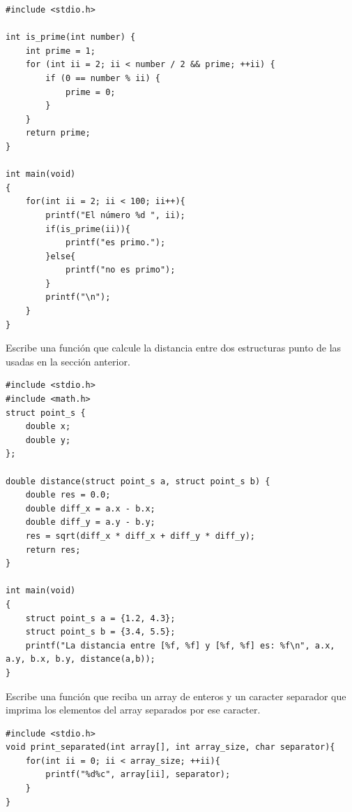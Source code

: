 \documentclass[a4paper]{article}
\begin{document}
\begin{exercises}
\noindent
\begin{minipage}[H]{\linewidth}
\mbox{}
\begin{lstlisting}[style=C,
caption={Solución al ejercicio 5},
label={lst:solution5}]
#include <stdio.h>

int is_prime(int number) {
    int prime = 1;
    for (int ii = 2; ii < number / 2 && prime; ++ii) {
        if (0 == number % ii) {
            prime = 0;
        }
    }
    return prime;
}

int main(void)
{
    for(int ii = 2; ii < 100; ii++){
        printf("El número %d ", ii);
        if(is_prime(ii)){
            printf("es primo.");
        }else{
            printf("no es primo");
        }
        printf("\n");
    }
}
\end{lstlisting}
\end{minipage}

\item Escribe una función que calcule la distancia entre dos estructuras punto
de las usadas en la sección anterior.


\noindent
\begin{minipage}[H]{\linewidth}
\mbox{}
\begin{lstlisting}[style=C,
caption={Solución al ejercicio 6},
label={lst:solution6}]
#include <stdio.h>
#include <math.h>
struct point_s {
    double x;
    double y;
};

double distance(struct point_s a, struct point_s b) {
    double res = 0.0;
    double diff_x = a.x - b.x;
    double diff_y = a.y - b.y;
    res = sqrt(diff_x * diff_x + diff_y * diff_y);
    return res;
}

int main(void)
{
    struct point_s a = {1.2, 4.3};
    struct point_s b = {3.4, 5.5};
    printf("La distancia entre [%f, %f] y [%f, %f] es: %f\n", a.x, a.y, b.x, b.y, distance(a,b));
}
\end{lstlisting}
\end{minipage}

\item Escribe una función que reciba un array de enteros y un caracter separador
que imprima los elementos del array separados por ese caracter.


\noindent
\begin{minipage}[H]{\linewidth}
\mbox{}
\begin{lstlisting}[style=C,
caption={Solución al ejercicio 7},
label={lst:solution7}]
#include <stdio.h>
void print_separated(int array[], int array_size, char separator){
    for(int ii = 0; ii < array_size; ++ii){
        printf("%d%c", array[ii], separator);
    }
}


\end{lstlisting}
\end{minipage}
\end{exercises}
\end{document}
